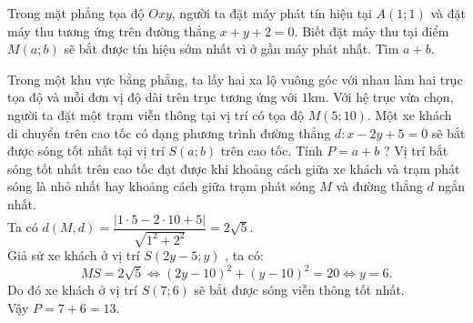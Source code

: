 \begin{bt}%
	Trong mặt phẳng tọa độ $O x y$, người ta đặt máy phát tín hiệu tại $A(1 ; 1)$ và đặt máy thu tương ứng trên đường thẳng $x+y+2=0$. Biết đặt máy thu tại điểm $M(a ; b)$ sẽ bắt được tín hiệu sớm nhất vì ở gần máy phát nhất. Tìm $a+b$.\par {}
\end{bt}

\begin{bt}%
	Trong một khu vực bằng phẳng, ta lấy hai xa lộ vuông góc với nhau làm hai trục tọa độ và mỗi đơn vị độ dài trên trục tương ứng với $1$km. Với hệ trục vừa chọn, người ta đặt một trạm viễn thông tại vị trí có tọa độ $M\left(5; 10\right)$. Một xe khách di chuyển trên cao tốc có dạng phương trình đường thẳng $d: x-2y+5=0$ sẽ bắt được sóng tốt nhất tại vị trí $S\left(a; b\right)$ trên cao tốc. Tính $P=a+b$ ?
	\loigiai
	{
		Vị trí bắt sóng tốt nhất trên cao tốc đạt được khi khoảng cách giữa xe khách và trạm phát sóng là nhỏ nhất hay khoảng cách giữa trạm phát sóng $M$  và đường thẳng $d$ ngắn nhất.\\
		Ta có $d\left(M, d\right)=\dfrac{|1\cdot5-2\cdot10+5|}{\sqrt{1^2+2^2}}=2\sqrt{5}.$\\
		Giả sử xe khách ở vị trí $S\left(2y-5; y\right)$ , ta có: $$MS=2\sqrt{5}\Leftrightarrow\left(2y-10\right)^2+\left(y-10\right)^2=20\Leftrightarrow y=6.$$
		Do đó xe khách ở vị trí $S\left(7; 6\right)$   sẽ bắt được sóng viễn thông tốt nhất.\\
		Vậy $P=7+6=13$.
	}
\end{bt}

